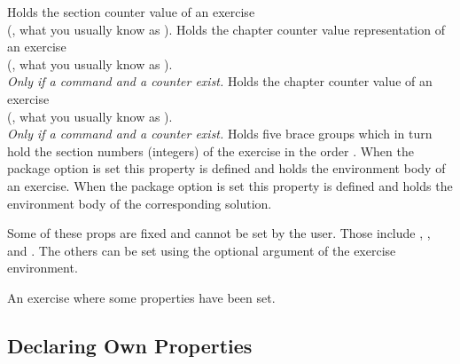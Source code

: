 \documentclass{xsim-manual}
\begin{document}
\begin{properties}
    Holds the section counter value of an exercise \\
    (\ie, what you usually know as ).
    Holds the chapter counter value representation of an exercise \\
    (\ie, what you usually know as ). \\
    \emph{Only if a command  \emph{and} a counter 
      exist.}
    Holds the chapter counter value of an exercise \\
    (\ie, what you usually know as ). \\
    \emph{Only if a command  \emph{and} a counter 
      exist.}
    Holds five brace groups which in turn hold the section numbers (integers)
    of the exercise in the order
    .
    When the package option  is set this
    property is defined and holds the environment body of an exercise.
    When the package option  is set this
    property is defined and holds the environment body of the corresponding
    solution.
\end{properties}

Some of these \acsp*{prop} are fixed and cannot be set by the user.  Those
include , , and .  The
others can be set using the optional argument of the exercise environment.

\begin{example}
  \begin{exercise}[subtitle={This is a subtitle},points=4,bonus-points=1]
    An exercise where some properties have been set.
  \end{exercise}
\end{example}

\subsection{Declaring Own Properties}
\end{document}
